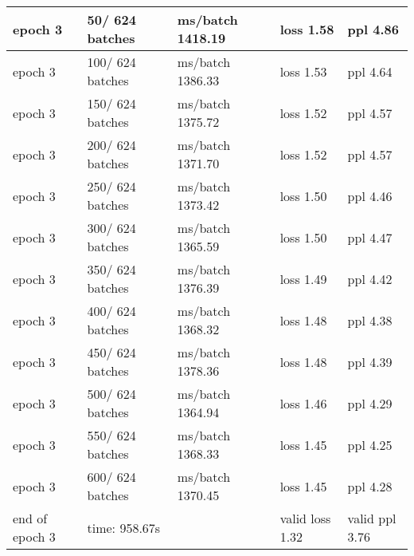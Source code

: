 \begin{center}
\begin{tabular}{ | m{3cm} | m{3cm}| m{4cm} | m{3cm} | m{3cm} | }
epoch   3 &    50/  624 batches & ms/batch 1418.19 & loss  1.58 & ppl     4.86\\ 
\hline
epoch   3 &   100/  624 batches & ms/batch 1386.33 & loss  1.53 & ppl     4.64\\ 
\hline
epoch   3 &   150/  624 batches & ms/batch 1375.72 & loss  1.52 & ppl     4.57\\ 
\hline
epoch   3 &   200/  624 batches & ms/batch 1371.70 & loss  1.52 & ppl     4.57\\ 
\hline
epoch   3 &   250/  624 batches & ms/batch 1373.42 & loss  1.50 & ppl     4.46\\ 
\hline
epoch   3 &   300/  624 batches & ms/batch 1365.59 & loss  1.50 & ppl     4.47\\ 
\hline
epoch   3 &   350/  624 batches & ms/batch 1376.39 & loss  1.49 & ppl     4.42\\ 
\hline
epoch   3 &   400/  624 batches & ms/batch 1368.32 & loss  1.48 & ppl     4.38\\ 
\hline
epoch   3 &   450/  624 batches & ms/batch 1378.36 & loss  1.48 & ppl     4.39\\ 
\hline
epoch   3 &   500/  624 batches & ms/batch 1364.94 & loss  1.46 & ppl     4.29\\ 
\hline
epoch   3 &   550/  624 batches & ms/batch 1368.33 & loss  1.45 & ppl     4.25\\ 
\hline
epoch   3 &   600/  624 batches & ms/batch 1370.45 & loss  1.45 & ppl     4.28\\ 
\hline

end of epoch   3 & time: 958.67s & & valid loss  1.32 & valid ppl     3.76
\\ 
\hline

\end{tabular}
\end{center}

